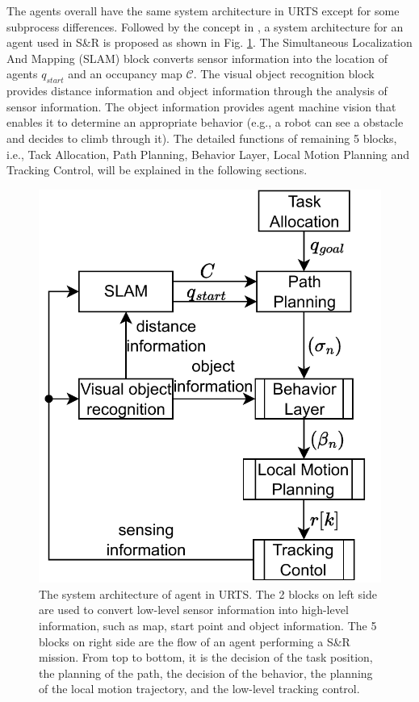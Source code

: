 \documentclass{ieeeaccess}
\begin{document}
The agents overall have the same system architecture in URTS except for some subprocess differences. Followed by the concept in \cite{paden2016survey}, a system architecture for an agent used in S\&R is proposed as shown in Fig. \ref{fig:sys}. The Simultaneous Localization And Mapping (SLAM) block converts sensor information into the location of agents $q_{start}$ and an occupancy map $\mathcal{C}$. The visual object recognition block provides distance information and object information through the analysis of sensor information. The object information provides agent machine vision that enables it to determine an appropriate behavior (e.g., a robot can see a obstacle and decides to climb through it). The detailed functions of remaining 5 blocks, i.e., Tack Allocation, Path Planning, Behavior Layer, Local Motion Planning and Tracking Control, will be explained in the following sections.


\begin{figure}[htbp]
\centering
\includegraphics[scale=.5]{fig/sys.pdf}\caption{The system architecture of agent in URTS. The 2 blocks on left side are used to convert low-level sensor information into high-level information, such as map, start point and object information. The 5 blocks on right side are the flow of an agent performing a S\&R mission. From top to bottom, it is the decision of the task position, the planning of the path, the decision of the behavior, the planning of the local motion trajectory, and the low-level tracking control.}%
\label{fig:sys}
\end{figure}
\end{document}
